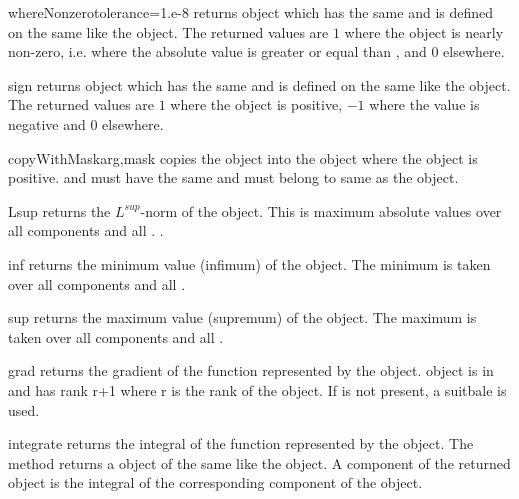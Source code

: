 \begin{methoddesc}[Data]{whereNonzero}{tolerance=1.e-8}
returns \Data object which has the same \Shape and is defined on
the same \FunctionSpace like the object. The returned values are $1$
where the object is nearly non-zero, i.e. where the absolute value is
greater or equal than , and $0$ elsewhere.
\end{methoddesc}

\begin{methoddesc}[Data]{sign}{}
returns \Data object which has the same \Shape and is defined on
the same \FunctionSpace like the object. The returned values are $1$
where the object is positive, $-1$ where the value is negative and $0$ elsewhere.
\end{methoddesc}

\begin{methoddesc}[Data]{copyWithMask}{arg,mask}
copies the \Data object  into the object 
where the \Data object  is positive. 
and  must have the same \Shape 
and must belong to same \FunctionSpace as
the object.
\end{methoddesc}

\begin{methoddesc}[Data]{Lsup}{}
returns the $L^{sup}$-norm of the object. This is maximum absolute values over all components and all \DataSamplePoints. .
\end{methoddesc}
\begin{methoddesc}[Data]{inf}{}
returns the minimum value (infimum) of the object. The minimum is
taken over all components and all \DataSamplePoints .  
\end{methoddesc}

\begin{methoddesc}[Data]{sup}{}
returns the maximum value (supremum) of the object. The maximum is
taken over all components and all \DataSamplePoints .  
\end{methoddesc}

\begin{methoddesc}[Data]{grad}{}
returns the gradient of the function represented by the object.
\Data object is in \FunctionSpace {} and has rank r+1 where r is the rank of the object.
If  is not present, a suitbale \FunctionSpace is used. 
\end{methoddesc}

\begin{methoddesc}[Data]{integrate}{}
returns the integral of the function represented by the object. The method returns
a  object of the same \Shape like the object.  A
component of the returned object is the integral of the corresponding
component of the object. 
\end{methoddesc}

